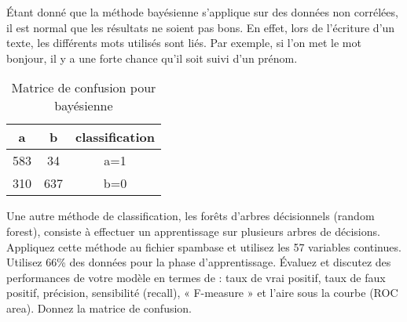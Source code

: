 \begin{homeworkProblem}
\begin{homeworkSection}{3.2}
{			Étant donné que la méthode bayésienne s'applique sur des données non corrélées, il est normal que les résultats ne soient pas bons.
			En effet, lors de l'écriture d'un texte, les différents mots utilisés sont liés.
			Par exemple, si l'on met le mot bonjour, il y a une forte chance qu'il soit suivi d'un prénom.
			
			}
			\begin{table}
			\centering
			\begin{tabular}{|c|c||c|}
			
			\hline 
			a & b & classification \\ 
			\hline 
			583 & 34 & a=1 \\ 
			\hline 
			310 & 637 & b=0 \\ 
			\hline 
			\end{tabular} 
			\caption{Matrice de confusion pour bayésienne}
			\label{tab:confMat32}			
			\end{table}			
			
		\end{homeworkSection}
			
		\begin{homeworkSection}{3.3}

			Une autre méthode de classification, les forêts d'arbres décisionnels (random forest), consiste à
			effectuer un apprentissage sur plusieurs arbres de décisions. Appliquez
			cette méthode au fichier spambase et utilisez les 57 variables continues. Utilisez 66\% des
			données pour la phase d'apprentissage.
			Évaluez et discutez des performances de votre modèle en termes de : taux de vrai positif,
			taux de faux positif, précision, sensibilité (recall), « F-measure » et l’aire sous la courbe
			(ROC area). Donnez la matrice de confusion.\\

\end{homeworkSection}
\end{homeworkProblem}
